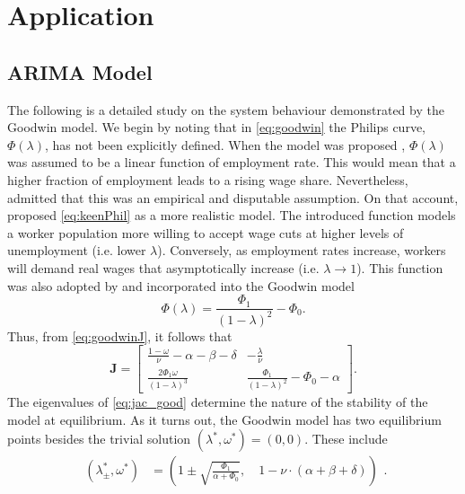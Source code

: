 \documentclass[12pt, centerh1]{article}
\begin{document}
\section{Application}

\subsection{ARIMA Model}
The following is a detailed study on the system behaviour demonstrated by the Goodwin model. We begin by noting that in \eqref{eq:goodwin} the Philips curve, $\Phi(\lambda)$, has not been explicitly defined. When the model was proposed \citep{goodwin1982growth}, $\Phi(\lambda)$ was assumed to be a linear function of employment rate. This would mean that a higher fraction of employment leads to a rising wage share. Nevertheless, \citet{goodwin1982growth} admitted that this was an empirical and disputable assumption. On that account, \citet{keen1995finance} proposed \eqref{eq:keenPhil} as a more realistic model. The introduced function models a worker population more willing to accept wage cuts at higher levels of unemployment (i.e. lower $\lambda$). Conversely, as employment rates increase, workers will demand real wages that asymptotically increase (i.e. $\lambda\to1$). This function was also adopted by \citet{grasselli2012analysis} and incorporated into the Goodwin model
\begin{equation} \label{eq:keenPhil}
    \Phi(\lambda) = \frac{\Phi_1}{(1-\lambda)^2}-\Phi_0.
\end{equation}
Thus, from \eqref{eq:goodwinJ}, it follows that
\begin{equation} \label{eq:jac_good}
    \mathbf J = \begin{bmatrix}
        \frac{1-\omega}{\nu}-\alpha-\beta-\delta & -\frac{\lambda}{\nu}\\[1ex]
        \frac{2\Phi_1\omega}{(1-\lambda)^3} & \frac{\Phi_1}{(1-\lambda)^2}-\Phi_0-\alpha
\end{bmatrix}.
\end{equation}
The eigenvalues of \eqref{eq:jac_good} determine the nature of the stability of the model at equilibrium. As it turns out, the Goodwin model has two equilibrium points besides the trivial solution $(\lambda^\ast,\omega^\ast)=(0, 0)$. These include
\begin{equation} \label{eq:goodwin_eqm}
\begin{split}
    (\lambda_\pm^\ast, \omega^\ast) &= \left(1\pm\sqrt{\frac{\Phi_1}{\alpha + \Phi_0}},\quad  1-\nu\cdot(\alpha + \beta + \delta)\right)
\end{split}.
\end{equation}
\end{document}
